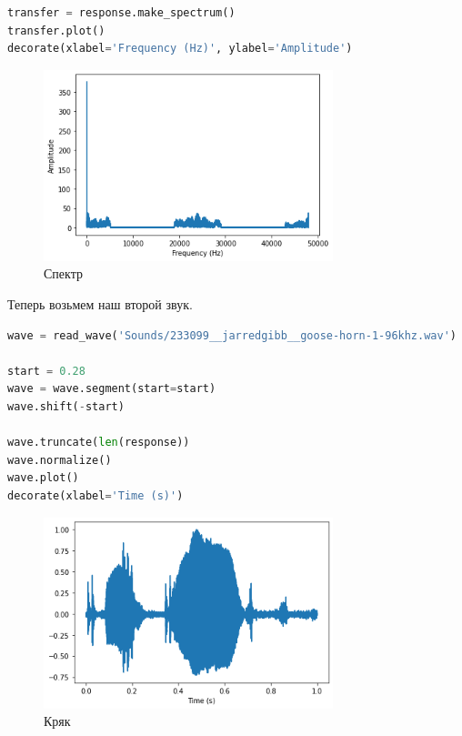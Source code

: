\documentclass[a4paper,12pt]{report}
\begin{document}
\begin{lstlisting}[language=Python,caption=Спектр импульса]
transfer = response.make_spectrum()
transfer.plot()
decorate(xlabel='Frequency (Hz)', ylabel='Amplitude')
\end{lstlisting}

    \begin{figure}[H]
        \centering
        \includegraphics[width=0.75\textwidth]{images/ex2_response_2.png}
        \caption{Спектр}
        \label{fig:ex2_response_2}
    \end{figure}
    
    Теперь возьмем наш второй звук.
    
\begin{lstlisting}[language=Python,caption=Зугрузка кряка]
wave = read_wave('Sounds/233099__jarredgibb__goose-horn-1-96khz.wav')

start = 0.28
wave = wave.segment(start=start)
wave.shift(-start)

wave.truncate(len(response))
wave.normalize()
wave.plot()
decorate(xlabel='Time (s)')
\end{lstlisting}

    \begin{figure}[H]
        \centering
        \includegraphics[width=0.75\textwidth]{images/ex2_horn_1.png}
        \caption{Кряк}
        \label{fig:ex2_horn_1}
    \end{figure}
    
\end{document}
